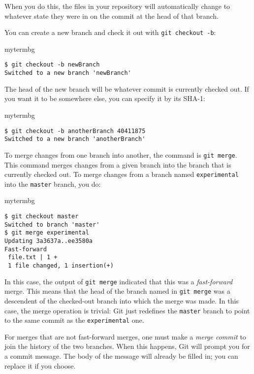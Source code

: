 When you do this, the files in your repository will automatically change to
whatever state they were in on the commit at the head of that branch.

You can create a new branch and check it out with \texttt{git checkout -b}:

\begin{tsession}{mytermbg}
\begin{verbatim}
$ git checkout -b newBranch
Switched to a new branch 'newBranch'
\end{verbatim}
\end{tsession}

The head of the new branch will be whatever commit is currently checked out.
If you want it to be somewhere else, you can specify it by its SHA-1:

\begin{tsession}{mytermbg}
\begin{verbatim}
$ git checkout -b anotherBranch 40411875
Switched to a new branch 'anotherBranch'
\end{verbatim}
\end{tsession}

To merge changes from one branch into another, the command is \texttt{git
merge}.  This command merges changes from a given branch into the branch that
is currently checked out.  To merge changes from a branch named
\texttt{experimental} into the \texttt{master} branch, you do:

\begin{tsession}{mytermbg}
\begin{verbatim}
$ git checkout master
Switched to branch 'master'
$ git merge experimental
Updating 3a3637a..ee3580a
Fast-forward
 file.txt | 1 +
 1 file changed, 1 insertion(+)
\end{verbatim}
\end{tsession}

In this case, the output of \texttt{git merge} indicated that this was a
\emph{fast-forward} merge.  This means that the head of the branch named in
\texttt{git merge} was a descendent of the checked-out branch into which the
merge was made.  In this case, the merge operation is trivial:  Git just
redefines the \texttt{master} branch to point to the same commit as the
\texttt{experimental} one.

For merges that are not fast-forward merges, one must make a \emph{merge
commit} to join the history of the two branches.  When this happens, Git will
prompt you for a commit message.  The body of the message will already be
filled in; you can replace it if you choose.

